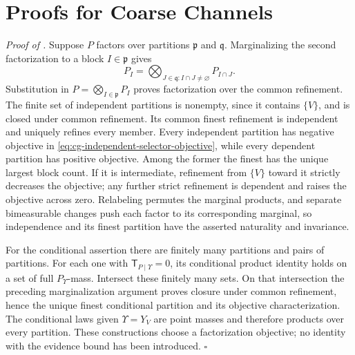 \section{Proofs for Coarse Channels}
\label{sec:proofs-coarse-channels}

\noindent\emph{Proof of .}
Suppose $P$ factors over partitions $\mathfrak p$ and $\mathfrak q$. Marginalizing
the second factorization to a block $I\in\mathfrak p$ gives
\begin{equation*}
P_I=\bigotimes_{J\in\mathfrak q:I\cap J\ne\varnothing}P_{I\cap J}.
\end{equation*}
Substitution in $P=\bigotimes_{I\in\mathfrak p}P_I$ proves factorization over the
common refinement. The finite set of independent partitions is nonempty, since it
contains $\{V\}$, and is closed under common refinement. Its common finest refinement
is independent and uniquely refines every member. Every independent partition has
negative objective in \eqref{eq:cg-independent-selector-objective}, while every
dependent partition has positive objective. Among the former the finest has the
unique largest block count. If it is intermediate, refinement from $\{V\}$ toward it
strictly decreases the objective; any further strict refinement is dependent and
raises the objective across zero. Relabeling permutes the marginal products, and
separate bimeasurable changes push each factor to its corresponding marginal, so
independence and its finest partition have the asserted naturality and invariance.

For the conditional assertion there are finitely many partitions and pairs of
partitions. For each one with $\mathsf T_{P\mid\Upsilon}=0$, its conditional product
identity holds on a set of full $P_\Upsilon$-mass. Intersect these finitely many sets.
On that intersection the preceding marginalization argument proves closure under
common refinement, hence the unique finest conditional partition and its objective
characterization. The conditional laws given $\Upsilon=Y_V$ are point masses and
therefore products over every partition. These constructions choose a factorization
objective; no identity with the evidence bound has been introduced. $\square$

